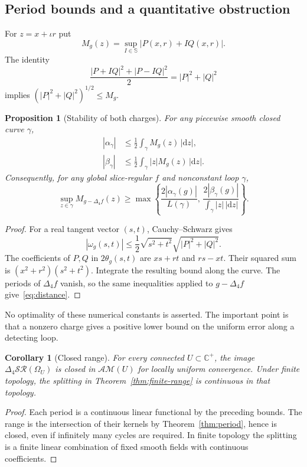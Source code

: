\documentclass[11pt,a4paper]{article}
\numberwithin{equation}{section}
\newtheorem{proposition}[theorem]{Proposition}
\newtheorem{corollary}[theorem]{Corollary}
\theoremstyle{definition}
\theoremstyle{remark}
\newcommand{\C}{\mathbb C}
\newcommand{\Sph}{\mathbb S}
\newcommand{\AM}{\mathcal{AM}}
\newcommand{\SR}{\mathcal{SR}}
\newcommand{\Lap}{\Delta_4}
\begin{document}
\subsection{Period bounds and a quantitative obstruction}
For $z=x+\iota r$ put
\[
 M_g(z)=\sup_{I\in\Sph}|P(x,r)+IQ(x,r)|.
\]
The identity
\[
 \frac{|P+IQ|^2+|P-IQ|^2}{2}=|P|^2+|Q|^2
\]
implies $(|P|^2+|Q|^2)^{1/2}\le M_g$.

\begin{proposition}[Stability of both charges]\label{prop:bounds}
For any piecewise smooth closed curve $\gamma$,
\begin{align}
 |\alpha_\gamma|&\le\frac12\int_\gamma M_g(z)\,|\mathrm dz|,
 \label{eq:alpha-bound}\\
 |\beta_\gamma|&\le\frac12\int_\gamma |z|M_g(z)\,|\mathrm dz|.
 \label{eq:beta-bound}
\end{align}
Consequently, for any global slice-regular $f$ and nonconstant loop
$\gamma$,
\begin{equation}
 \sup_{z\in\gamma}M_{g-\Lap f}(z)
 \ge\max\left\{
 \frac{2|\alpha_\gamma(g)|}{L(\gamma)},\,
 \frac{2|\beta_\gamma(g)|}{\int_\gamma|z|\,|\mathrm dz|}
 \right\}.
 \label{eq:distance}
\end{equation}
\end{proposition}
\begin{proof}
For a real tangent vector $(s,t)$, Cauchy--Schwarz gives
\[
 |\omega_g(s,t)|\le\frac12\sqrt{s^2+t^2}\sqrt{|P|^2+|Q|^2}.
\]
The coefficients of $P,Q$ in $2\theta_g(s,t)$ are $xs+rt$ and
$rs-xt$. Their squared sum is $(x^2+r^2)(s^2+t^2)$.
Integrate the resulting bound along the curve. The periods of
$\Lap f$ vanish, so the same inequalities applied to $g-\Lap f$
give~\eqref{eq:distance}.
\end{proof}
No optimality of these numerical constants is asserted. The important
point is that a nonzero charge gives a positive lower bound on the
uniform error along a detecting loop.

\begin{corollary}[Closed range]\label{cor:closed-range}
For every connected $U\subset\C^+$, the image
$\Lap\SR(\Omega_U)$ is closed in $\AM(U)$ for locally uniform
convergence. Under finite topology, the splitting in
Theorem~\ref{thm:finite-range} is continuous in that topology.
\end{corollary}
\begin{proof}
Each period is a continuous linear functional by the preceding bounds.
The range is the intersection of their kernels by
Theorem~\ref{thm:period}, hence is closed, even if infinitely many cycles
are required. In finite topology the splitting is a finite linear
combination of fixed smooth fields with continuous coefficients.
\end{proof}
\end{document}
